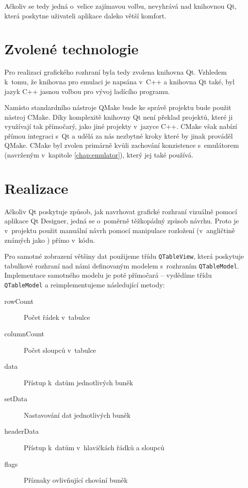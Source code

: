 Ačkoliv se tedy jedná o~velice zajímavou volbu, nevyhrává nad knihovnou Qt, která poskytne uživateli aplikace daleko větší komfort.

\section{Zvolené technologie}

Pro realizaci grafického rozhraní byla tedy zvolena knihovna Qt. Vzhledem k~tomu, že knihovna pro emulaci je napsána v~C++ a knihovna Qt také, byl jazyk C++ jasnou volbou pro vývoj ladícího programu.

Namísto standardního nástroje QMake bude ke správě projektu bude použit nástroj CMake. Díky komplexitě knihovny Qt není překlad projektů, které ji využívají tak přímočarý, jako jiné projekty v~jazyce C++. CMake však nabízí přímou integraci s~Qt a udělá za nás nezbytné kroky které by jinak prováděl QMake. CMake byl zvolen primárně kvůli zachování konzistence s~emulátorem (navrženým v~kapitole \ref{chap:emulator}), který jej také používá.

\section{Realizace}

Ačkoliv Qt poskytuje způsob, jak navrhovat grafické rozhraní vizuálně pomocí aplikace Qt Designer\cite{qt-designer}, jedná se o~poměrně těžkopádný způsob návrhu. Proto je v~projektu použit manuální návrh pomocí manipulace rozložení (v~angličtině známých jako ) přímo v~kódu.

Pro samotné zobrazení většiny dat použijeme třídu \texttt{QTableView}, která poskytuje tabulkové rozhraní nad námi definovaným modelem s~rozhraním \texttt{QTableModel}. Implementace samotného modelu je poté přímočará -- vydědíme třídu \texttt{QTableModel} a reimplementujeme následující metody:

\begin{description}
	\item[rowCount] Počet řádek v~tabulce
	\item[columnCount] Počet sloupců v~tabulce
	\item[data] Přístup k~datům jednotlivých buněk
	\item[setData] Nastavování dat jednotlivých buněk
	\item[headerData] Přístup k~datům v~hlavičkách řádků a sloupců
	\item[flags] Příznaky ovlivňující chování buněk
\end{description}

